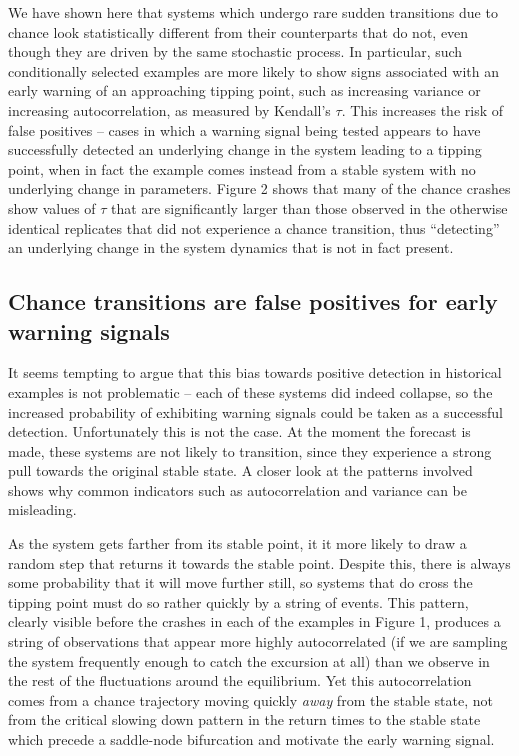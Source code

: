 \documentclass[authoryear,review,12pt]{elsarticle}
\begin{document}
We have shown here that systems which undergo rare sudden transitions
due to chance look statistically different from their counterparts that
do not, even though they are driven by the same stochastic process.
In particular, such conditionally selected examples are more likely to
show signs associated with an early warning of an approaching tipping
point, such as increasing variance or increasing autocorrelation,
as measured by Kendall's $\tau$.  This increases the risk of false
positives -- cases in which a warning signal being tested appears to
have successfully detected an underlying change in the system leading
to a tipping point, when in fact the example comes instead from a stable
system with no underlying change in parameters. Figure 2 shows that many
of the chance crashes show values of $\tau$ that are significantly larger
than those observed in the otherwise identical replicates that did not
experience a chance transition, thus ``detecting'' an underlying change
in the system dynamics that is not in fact present.




\subsection{Chance transitions are false positives for early warning signals}

It seems tempting to argue that this bias towards positive detection
in historical examples is not problematic -- each of these systems did
indeed collapse, so the increased probability of exhibiting warning
signals could be taken as a successful detection.  Unfortunately this is
not the case. At the moment the forecast is made, these systems are not
likely to transition, since they experience a strong pull towards the
original stable state.  A closer look at the patterns involved shows why
common indicators such as autocorrelation and variance can be misleading.

As the system gets farther from its stable point, it it more likely to
draw a random step that returns it towards the stable point. Despite
this, there is always some probability that it will move further still,
so systems that do cross the tipping point must do so rather quickly by
a string of events.  This pattern, clearly visible before the crashes
in each of the examples in Figure 1, produces a string of observations
that appear more highly autocorrelated (if we are sampling the system
frequently enough to catch the excursion at all) than we observe in the
rest of the fluctuations around the equilibrium.  Yet this autocorrelation
comes from a chance trajectory moving quickly \emph{away} from the
stable state, not from the critical slowing down pattern in the return
times to the stable state which precede a saddle-node bifurcation and
motivate the early warning signal.
\end{document}
